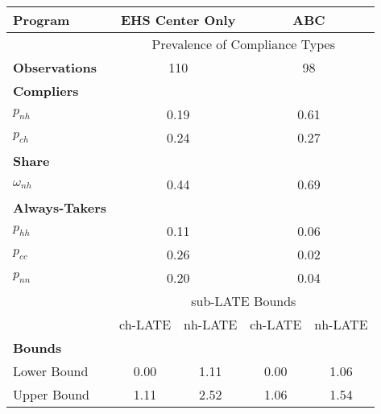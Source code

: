 \begin{tabular}{lcccc}
\toprule 
\midrule 
Program & \multicolumn{2}{c}{EHS Center Only} & \multicolumn{2}{c}{ABC} \\
\midrule 
 & \multicolumn{4}{c}{Prevalence of Compliance Types} \\
 \cmidrule(lr){2-5} 
\textbf{Observations} & \multicolumn{2}{c}{110} & \multicolumn{2}{c}{98} \\
\textbf{Compliers} \\
\quad $p_{nh}$ & \multicolumn{2}{c}{0.19} & \multicolumn{2}{c}{0.61} \\
\quad $p_{ch}$ & \multicolumn{2}{c}{0.24} & \multicolumn{2}{c}{0.27} \\
\textbf{Share} \\
\quad $\omega_{nh}$ & \multicolumn{2}{c}{0.44} & \multicolumn{2}{c}{0.69} \\
\textbf{Always-Takers} \\
\quad $p_{hh}$ & \multicolumn{2}{c}{0.11} & \multicolumn{2}{c}{0.06} \\
\quad $p_{cc}$ & \multicolumn{2}{c}{0.26} & \multicolumn{2}{c}{0.02} \\
\quad $p_{nn}$ & \multicolumn{2}{c}{0.20} & \multicolumn{2}{c}{0.04} \\
\midrule 
 & \multicolumn{4}{c}{sub-LATE Bounds} \\
 \cmidrule(lr){2-5} 
 & ch-LATE & nh-LATE & ch-LATE & nh-LATE \\
 \cmidrule(lr){2-3} \cmidrule(lr){4-5} 
\textbf{Bounds} \\
\quad Lower Bound & 0.00 & 1.11 & 0.00 & 1.06 \\
\quad Upper Bound & 1.11 & 2.52 & 1.06 & 1.54 \\
\midrule 
\bottomrule 
\end{tabular}
